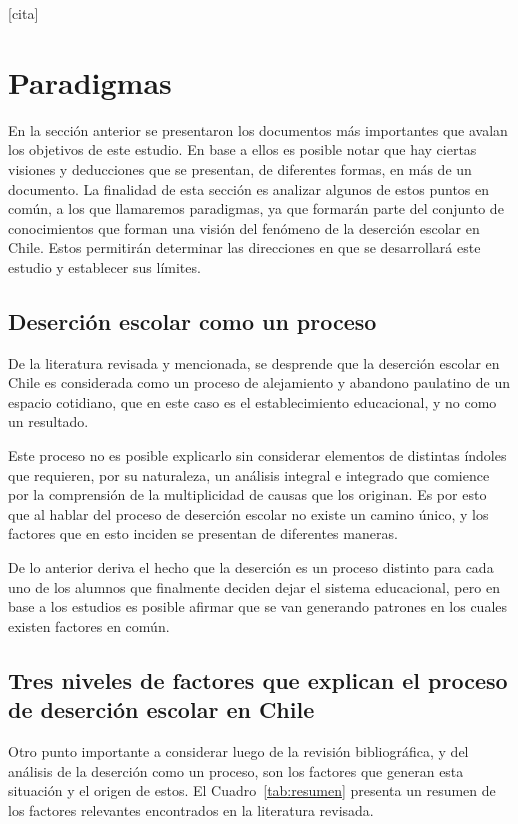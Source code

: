 [cita] 


\section{Paradigmas}
En la sección anterior se presentaron los documentos más importantes que avalan los objetivos de este estudio. 
En base a ellos es posible notar que hay ciertas visiones y deducciones que se presentan, de diferentes formas, en más de un documento. La finalidad de esta sección es analizar algunos de estos puntos en común, a los que llamaremos paradigmas, ya que formarán parte del conjunto de conocimientos que forman una visión del fenómeno de la deserción escolar en Chile. Estos permitirán determinar las direcciones en que se desarrollará este estudio y establecer sus límites. 

\subsection{Deserción escolar como un proceso}
De la literatura revisada y mencionada, se desprende que la deserción escolar en Chile es considerada como un proceso de alejamiento y abandono paulatino de un espacio cotidiano, que en este caso es el establecimiento educacional, y no como un resultado.

Este proceso no es posible explicarlo sin considerar elementos de distintas índoles que requieren, por su naturaleza, un análisis integral e integrado que comience por la comprensión de la multiplicidad de causas que los originan. Es por esto que al hablar del proceso de deserción escolar no existe un camino único, y los factores que en esto inciden se presentan de diferentes maneras.

De lo anterior deriva el hecho que la deserción es un proceso distinto para cada uno de los alumnos que finalmente deciden dejar el sistema educacional, pero en base a los estudios es posible afirmar que se van generando patrones en los cuales existen factores en común. 

\subsection{Tres niveles de factores que explican el proceso de deserción escolar en Chile}
Otro punto importante a considerar luego de la revisión bibliográfica, y del análisis de la deserción como un proceso, son los factores que generan esta situación y el origen de estos. El Cuadro~\ref{tab:resumen} presenta un resumen de los factores relevantes encontrados en la literatura revisada. 

